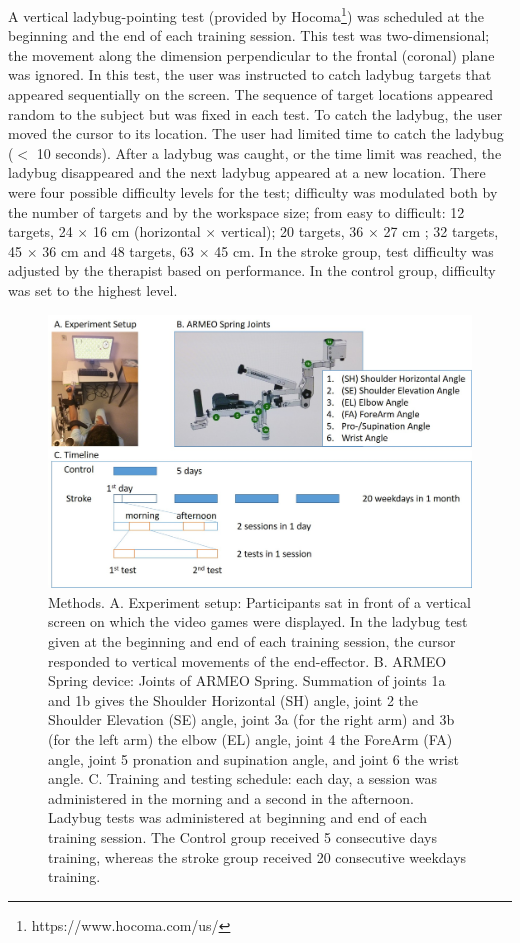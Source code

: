 A vertical ladybug-pointing test (provided by Hocoma\footnote{https://www.hocoma.com/us/}) was scheduled at the beginning and the end of each training session. 
This test was two-dimensional; the movement along the dimension perpendicular to the frontal (coronal) plane was ignored. 
In this test, the user was instructed to catch ladybug targets that appeared sequentially on the screen. 
The sequence of target locations appeared random to the subject but was fixed in each test. 
To catch the ladybug, the user moved the cursor to its location. 
The user had limited time to catch the ladybug ($<$ 10 seconds). 
After a ladybug was caught, or the time limit was reached, the ladybug disappeared and the next ladybug appeared at a new location. 
There were four possible difficulty levels for the test; difficulty was modulated both by the number of targets and by the workspace size; from easy to difficult: 12 targets, 24 $ \times $ 16 cm (horizontal $ \times $ vertical);  20 targets, 36 $ \times $ 27 cm ; 32 targets, 45 $ \times $ 36 cm and 48 targets, 63 $ \times $ 45 cm. In the stroke group, test difficulty was adjusted by the therapist based on performance. 
In the control group, difficulty was set to the highest level. 


\begin{figure}
	\centering
	\includegraphics[width=1\linewidth]{figures/1setup&schedule}
	\caption[Methods.]
	{Methods.
		A. Experiment setup: Participants sat in front of a vertical screen on which the video games were displayed. In the ladybug test given at the beginning and end of each training session, the cursor responded to vertical movements of the end-effector. 
		B. ARMEO Spring device: Joints of ARMEO Spring. Summation of joints 1a and 1b gives the Shoulder Horizontal (SH) angle, joint 2 the Shoulder Elevation (SE) angle, joint 3a (for the right arm) and 3b (for the left arm) the elbow (EL) angle, joint 4 the ForeArm (FA) angle, joint 5 pronation and supination angle, and joint 6 the wrist angle. 
		C. Training and testing schedule: each day, a session was administered in the morning and a second in the afternoon. Ladybug tests was administered at beginning and end of each training session. The Control group received 5 consecutive days training, whereas the stroke group received 20 consecutive weekdays training.}
	\label{fig:1setupschedule}
\end{figure}

